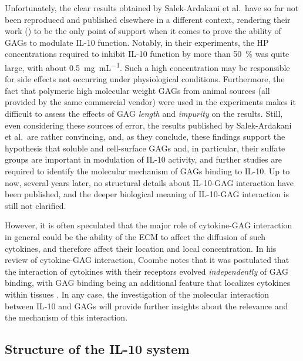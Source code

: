 Unfortunately, the clear results obtained by Salek-Ardakani et al.\ have so far
not been reproduced and published elsewhere in a different context, rendering
their work (\cite{salek_ardakani_2000}) to be the only point of support when it
comes to prove the ability of GAGs to modulate IL-10 function. Notably, in their
experiments, the HP concentrations required to inhibit IL-10 function by more
than \SI{50}{\percent} was quite large, with about
\SI{0.5}{\milli\gram\per\milli\liter}. Such a high concentration may be
responsible for side effects not occurring under physiological conditions.
Furthermore, the fact that polymeric high molecular weight GAGs from animal
sources (all provided by the same commercial vendor) were used in the
experiments makes it difficult to assess the effects of GAG \textit{length} and
\textit{impurity} on the results. Still, even considering these sources of
error, the results published by Salek-Ardakani et al.\ are rather convincing,
and, as they conclude, these findings support the hypothesis that soluble and
cell-surface GAGs and, in particular, their sulfate groups are important in
modulation of IL-10 activity, and further studies are required to identify the
molecular mechanism of GAGs binding to IL-10. Up to now, several years later, no
structural details about IL-10-GAG interaction have been published, and the
deeper biological meaning of IL-10-GAG interaction is still not clarified.

However, it is often speculated that the major role of cytokine-GAG interaction
in general could be the ability of the ECM to affect the diffusion of such
cytokines, and therefore affect their location and local concentration. In his
review of cytokine-GAG interaction, Coombe notes that it was postulated that the
interaction of cytokines with their receptors evolved \textit{independently} of
GAG binding, with GAG binding being an additional feature that localizes
cytokines within tissues \cite{coombe_cytokine_gag_2008}. In any case, the
investigation of the molecular interaction between IL-10 and GAGs will provide
further insights about the relevance and the mechanism of this interaction.


\subsection{Structure of the IL-10 system}

